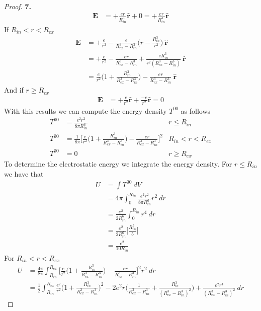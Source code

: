 \documentclass[11pt]{article}
\newcommand{\hatr}{\bm{\hat{r}}}
\theoremstyle{definition}
\begin{document}
\begin{proof}{\textbf{7.}}
\begin{align*}
    \bm{E} &= +\frac{er}{R_{in}^3}\hatr + 0
    = +\frac{er}{R_{in}^3}\hatr
\end{align*}
If $R_{in} < r < R_{ex}$
\begin{align*}
    \bm{E} &= +\frac{e}{r^2}
    - \frac{e}{R_{ex}^3 - R_{in}^3}\bigg(r - \frac{R_{in}^3}{r^2}\bigg)~\hatr\\
    &= +\frac{e}{r^2}
    - \frac{er}{R_{ex}^3 - R_{in}^3}
    + \frac{eR_{in}^3}{r^2(R_{ex}^3 - R_{in}^3)}~\hatr\\
    &= \frac{e}{r^2}\bigg(1 + \frac{R_{in}^3}{R_{ex}^3 - R_{in}^3}\bigg)
    - \frac{er}{R_{ex}^3 - R_{in}^3}~\hatr
\end{align*}
And if $r \geq R_{ex}$
\begin{align*}
    \bm{E} &= +\frac{e}{r^2}\hatr + \frac{-e}{r^2}\hatr = 0
\end{align*}
With this results we can compute the energy density $T^{00}$ as follows
\begin{align*}
    T^{00} &= \frac{e^2r^2}{8\pi R_{in}^6} &r \leq R_{in}\\
    T^{00} &= \frac{1}{8\pi}
    \bigg[\frac{e}{r^2}\bigg(1 + \frac{R_{in}^3}{R_{ex}^3 - R_{in}^3}\bigg)
    - \frac{er}{R_{ex}^3 - R_{in}^3}\bigg]^2 &R_{in} < r < R_{ex}\\
    T^{00} &= 0 &r \geq R_{ex}
\end{align*}
To determine the electrostatic energy we integrate the energy density.
For $r \leq R_{in}$ we have that 
\begin{align*}
    U &= \int T^{00}~dV\\
    &= 4\pi \int_{0}^{R_{in}}\frac{e^2r^2}{8\pi R_{in}^6} r^2~dr\\
    &= \frac{e^2}{2R_{in}^6} \int_{0}^{R_{in}} r^4~dr\\
    &= \frac{e^2}{2R_{in}^6} \bigg[\frac{R_{in}^5}{5}\bigg]\\
    &= \frac{e^2}{10R_{in}}
\end{align*}
For $R_{in} < r < R_{ex}$
\begin{align*}
    U &= \frac{4\pi}{8\pi}\int_{R_{in}}^{R_{ex}}
    \bigg[\frac{e}{r^2}\bigg(1 + \frac{R_{in}^3}{R_{ex}^3 - R_{in}^3}\bigg)
    - \frac{er}{R_{ex}^3 - R_{in}^3}\bigg]^2 r^2~dr\\
    &= \frac{1}{2}\int_{R_{in}}^{R_{ex}}
    \frac{e^2}{r^2}\bigg(1 + \frac{R_{in}^3}{R_{ex}^3 - R_{in}^3}\bigg)^2
    - 2e^2r\bigg(\frac{1}{R_{ex}^3 - R_{in}^3}
    + \frac{R_{in}^3}{(R_{ex}^3 - R_{in}^3)^2}\bigg)
    + \frac{e^2r^4}{(R_{ex}^3 - R_{in}^3)^2}~dr
\end{align*}

\end{proof}
\end{document}
